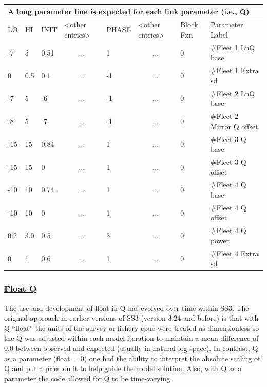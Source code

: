 \begin{longtable}{p{1cm} p{1cm} p{1cm} p{1.5cm} p{1.5cm} p{1.5cm} p{1.75cm} p{4cm}}
	\multicolumn{8}{l}{A long parameter line is expected for each link parameter (i.e., Q)} \\
	\hline
	LO \Tstrut & HI & INIT & <other entries> & PHASE & <other entries> & Block Fxn & Parameter Label \Bstrut\\
	\hline
	-7  & 5   & 0.51 & \multicolumn{1}{c}{...} &  1 & \multicolumn{1}{c}{...} & 0 & \#Fleet 1 LnQ base \Tstrut\\
	 0  & 0.5 & 0.1  & \multicolumn{1}{c}{...} & -1 & \multicolumn{1}{c}{...} & 0 & \#Fleet 1 Extra \gls{sd} \\
	-7  & 5   & -6   & \multicolumn{1}{c}{...} & -1 & \multicolumn{1}{c}{...} & 0 & \#Fleet 2 LnQ base \\
	-8  & 5   & -7   & \multicolumn{1}{c}{...} & -1 & \multicolumn{1}{c}{...} & 0 & \#Fleet 2 Mirror Q offset \\
	-15 & 15  & 0.84 & \multicolumn{1}{c}{...} &  1 & \multicolumn{1}{c}{...} & 0 & \#Fleet 3 Q base \\
    -15 & 15  & 0    & \multicolumn{1}{c}{...} &  1 & \multicolumn{1}{c}{...} & 0 & \#Fleet 3 Q offset \\
	-10 & 10  & 0.74 & \multicolumn{1}{c}{...} &  1 & \multicolumn{1}{c}{...} & 0 & \#Fleet 4 Q base \\
    -10 & 10  & 0    & \multicolumn{1}{c}{...} &  1 & \multicolumn{1}{c}{...} & 0 & \#Fleet 4 Q offset \\
    0.2 & 3.0 & 0.5  & \multicolumn{1}{c}{...} &  3 & \multicolumn{1}{c}{...} & 0 & \#Fleet 4 Q power \Bstrut\\
	 0  & 1   & 0.6  & \multicolumn{1}{c}{...} &  1 & \multicolumn{1}{c}{...} & 0 & \#Fleet 4 Extra \gls{sd} \\
	\hline
\end{longtable}

\hypertarget{FloatQ}{}
\subsubsection[Float Q]{\protect\hyperlink{FloatQ}{Float Q}}
The use and development of float in Q has evolved over time within SS3. The original approach in earlier versions of SS3 (version 3.24 and before) is that with Q ``float'' the units of the survey or fishery \gls{cpue} were treated as dimensionless so the Q was adjusted within each model iteration to maintain a mean difference of 0.0 between observed and expected (usually in natural log space). In contrast, Q as a parameter (float = 0) one had the ability to interpret the absolute scaling of Q and put a prior on it to help guide the model solution. Also, with Q as a parameter the code allowed for Q to be time-varying.

